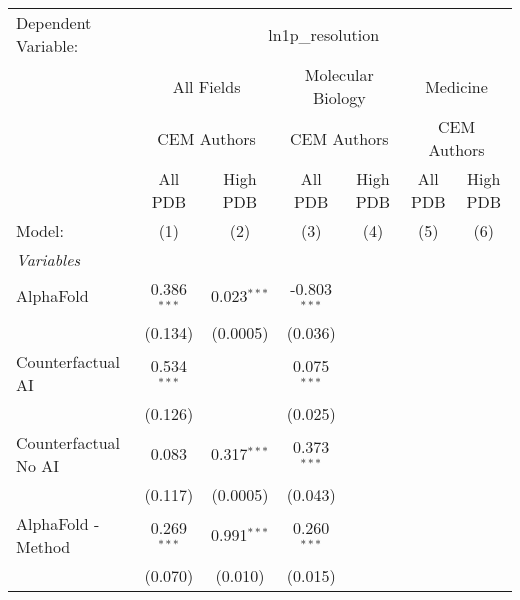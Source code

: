 \begingroup
\centering
\begin{tabular}{lcccccc}
   \tabularnewline \midrule \midrule
   Dependent Variable: & \multicolumn{6}{c}{ln1p\_resolution}\\
 & \multicolumn{2}{c}{All Fields} & \multicolumn{2}{c}{Molecular Biology} & \multicolumn{2}{c}{Medicine} \\
\cmidrule(lr){2-3} \cmidrule(lr){4-5} \cmidrule(lr){6-7}
 & \multicolumn{2}{c}{CEM Authors} & \multicolumn{2}{c}{CEM Authors} & \multicolumn{2}{c}{CEM Authors} \\
\cmidrule(lr){2-3} \cmidrule(lr){4-5} \cmidrule(lr){6-7}
 & \multicolumn{1}{c}{All PDB} & \multicolumn{1}{c}{High PDB} & \multicolumn{1}{c}{All PDB} & \multicolumn{1}{c}{High PDB} & \multicolumn{1}{c}{All PDB} & \multicolumn{1}{c}{High PDB} \\
\cmidrule(lr){2-2} \cmidrule(lr){3-3} \cmidrule(lr){4-4} \cmidrule(lr){5-5} \cmidrule(lr){6-6} \cmidrule(lr){7-7}
   Model:                                                     & (1)            & (2)           & (3)            & (4) & (5) & (6)\\  
   \midrule
   \emph{Variables}\\
   AlphaFold                                                  & 0.386$^{***}$  & 0.023$^{***}$ & -0.803$^{***}$ &     &     &   \\   
                                                              & (0.134)        & (0.0005)      & (0.036)        &     &     &   \\   
   Counterfactual AI                                          & 0.534$^{***}$  &               & 0.075$^{***}$  &     &     &   \\   
                                                              & (0.126)        &               & (0.025)        &     &     &   \\   
   Counterfactual No AI                                       & 0.083          & 0.317$^{***}$ & 0.373$^{***}$  &     &     &   \\   
                                                              & (0.117)        & (0.0005)      & (0.043)        &     &     &   \\   
   AlphaFold - Method                                         & 0.269$^{***}$  & 0.991$^{***}$ & 0.260$^{***}$  &     &     &   \\   
                                                              & (0.070)        & (0.010)       & (0.015)        &     &     &   \\   

\end{tabular}
